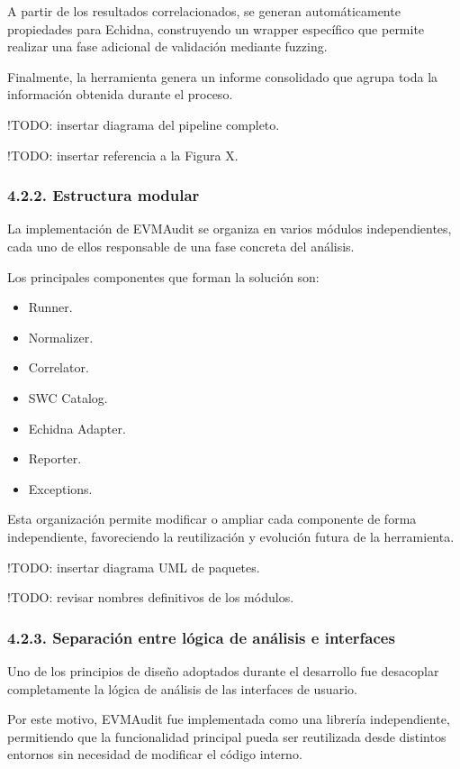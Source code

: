 A partir de los resultados correlacionados, se generan automáticamente
propiedades para Echidna, construyendo un wrapper específico que permite
realizar una fase adicional de validación mediante fuzzing.

Finalmente, la herramienta genera un informe consolidado que agrupa toda
la información obtenida durante el proceso.

!TODO: insertar diagrama del pipeline completo.

!TODO: insertar referencia a la Figura X.

\subsubsection{4.2.2. Estructura modular}\label{estructura-modular}

La implementación de EVMAudit se organiza en varios módulos
independientes, cada uno de ellos responsable de una fase concreta del
análisis.

Los principales componentes que forman la solución son:

\begin{itemize}
\tightlist
\item
  Runner.
\item
  Normalizer.
\item
  Correlator.
\item
  SWC Catalog.
\item
  Echidna Adapter.
\item
  Reporter.
\item
  Exceptions.
\end{itemize}

Esta organización permite modificar o ampliar cada componente de forma
independiente, favoreciendo la reutilización y evolución futura de la
herramienta.

!TODO: insertar diagrama UML de paquetes.

!TODO: revisar nombres definitivos de los módulos.

\subsubsection{4.2.3. Separación entre lógica de análisis e
interfaces}\label{separaciuxf3n-entre-luxf3gica-de-anuxe1lisis-e-interfaces}

Uno de los principios de diseño adoptados durante el desarrollo fue
desacoplar completamente la lógica de análisis de las interfaces de
usuario.

Por este motivo, EVMAudit fue implementada como una librería
independiente, permitiendo que la funcionalidad principal pueda ser
reutilizada desde distintos entornos sin necesidad de modificar el
código interno.

